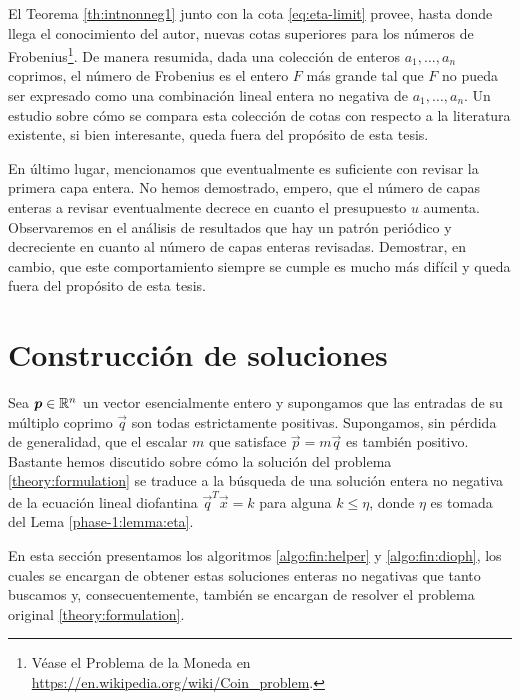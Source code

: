 El Teorema \ref{th:intnonneg1} junto con la cota \eqref{eq:eta-limit} provee, hasta donde llega el
conocimiento del autor, nuevas cotas superiores para los números de Frobenius\footnote{
	Véase el Problema de la Moneda en \url{https://en.wikipedia.org/wiki/Coin_problem}.
}. De manera resumida,
dada una colección de enteros $a_1, \ldots, a_n$ coprimos, el número de Frobenius es el entero $F$
más grande tal que $F$ no pueda ser expresado como una combinación lineal entera no negativa de
$a_1, \ldots, a_n$. Un estudio sobre cómo se compara esta colección de cotas con respecto a la
literatura existente, si bien interesante, queda fuera del propósito de esta tesis.

En último lugar, mencionamos que eventualmente es suficiente con revisar la primera capa entera. No
hemos demostrado, empero, que el número de capas enteras a revisar eventualmente decrece en cuanto
el presupuesto $u$ aumenta. Observaremos en el análisis de resultados que hay un patrón periódico y
decreciente en cuanto al número de capas enteras revisadas. Demostrar, en cambio, que este
comportamiento siempre se cumple es mucho más difícil y queda fuera del propósito de esta tesis.

\section{Construcción de soluciones}
\label{subsec:complex}

\noindent
Sea $\boldsymbol{p} \in \mathbb{R}^n$ un vector esencialmente entero y supongamos que las entradas de su múltiplo
coprimo $\vec{q}$ son todas estrictamente positivas. Supongamos, sin pérdida de generalidad, que el
escalar $m$ que satisface $\vec{p} = m\vec{q}$ es también positivo. Bastante hemos discutido sobre
cómo la solución del problema \eqref{theory:formulation} se traduce a la búsqueda de una solución
entera no negativa de la ecuación lineal diofantina $\vec{q}^T\vec{x} = k$ para alguna $k \leq \eta$,
donde $\eta$ es tomada del Lema \ref{phase-1:lemma:eta}.

En esta sección presentamos los algoritmos \ref{algo:fin:helper} y
\ref{algo:fin:dioph}, los cuales se encargan de obtener estas soluciones enteras no negativas que
tanto buscamos y, consecuentemente, también se encargan de resolver el problema original
\eqref{theory:formulation}.


